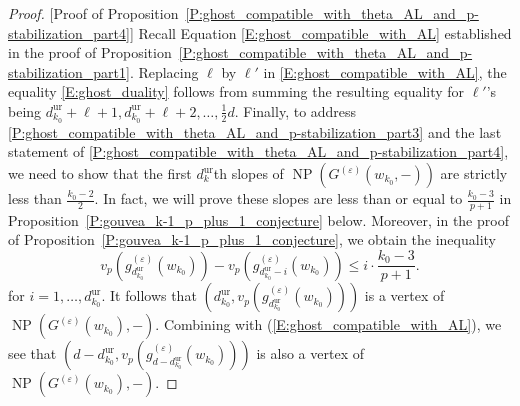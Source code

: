 \begin{proof}
    [Proof of Proposition~\ref{P:ghost_compatible_with_theta_AL_and_p-stabilization_part4}]
    Recall Equation \eqref{E:ghost_compatible_with_AL} established in the proof of Proposition~\ref{P:ghost_compatible_with_theta_AL_and_p-stabilization_part1}.
    Replacing $\ell$ by $\ell'$ in \eqref{E:ghost_compatible_with_AL}, the equality \eqref{E:ghost_duality} follows from summing the resulting equality for $\ell'$'s being $d_{k_0}^{{\mathrm{ur}}} + \ell+1, d_{k_0}^{{\mathrm{ur}}} +\ell+2, \dots, \frac12 d$.
    Finally, to address \ref{P:ghost_compatible_with_theta_AL_and_p-stabilization_part3} and the last statement of \ref{P:ghost_compatible_with_theta_AL_and_p-stabilization_part4}, we need to show that the first $d_{k}^{\mathrm{ur}}$th slopes of ${\operatorname{NP}}(G^{(\varepsilon)}(w_{k_0}, -))$ are strictly less than $\frac{k_0-2}2$. In fact, we will prove these slopes are less than or equal to $\frac{k_0-3}{p+1}$ in Proposition~\ref{P:gouvea_k-1_p_plus_1_conjecture} below. Moreover, in the proof of Proposition~\ref{P:gouvea_k-1_p_plus_1_conjecture}, we obtain the inequality
    $$
    v_p(g^{(\varepsilon)}_{d_{k_0}^{\mathrm{ur}}}(w_{k_0})) - v_p(g^{(\varepsilon)}_{d_{k_0}^{\mathrm{ur}}-i}(w_{k_0})) \leq i \cdot \frac{k_0-3}{p+1}.
    $$
    for $i=1,\dots,d_{k_0}^{\mathrm{ur}}$. It follows that $(d_{k_0}^{\mathrm{ur}},v_p(g_{d_{k_0}^{\mathrm{ur}}}^{(\varepsilon)}(w_{k_0})))$ is a vertex of ${\operatorname{NP}}(G^{(\varepsilon)}(w_{k_0}),-)$. Combining with (\ref{E:ghost_compatible_with_AL}), we see that $(d-d_{k_0}^{\mathrm{ur}},v_p(g_{d-d_{k_0}^{\mathrm{ur}}}^{(\varepsilon)}(w_{k_0})))$ is also a vertex of ${\operatorname{NP}}(G^{(\varepsilon)}(w_{k_0}),-)$.
\end{proof}


